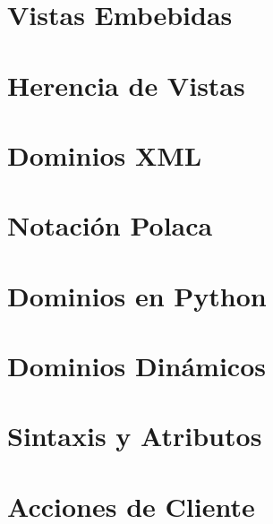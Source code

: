 \documentclass[letterpaper,10pt,spanish]{sphinxmanual}
\begin{document}
\section{Vistas Embebidas}
\label{\detokenize{tecnico/vistas/vistas-embebidas:vistas-embebidas}}\label{\detokenize{tecnico/vistas/vistas-embebidas:id1}}\label{\detokenize{tecnico/vistas/vistas-embebidas::doc}}

\section{Herencia de Vistas}
\label{\detokenize{tecnico/vistas/herencia-de-vistas:herencia-de-vistas}}\label{\detokenize{tecnico/vistas/herencia-de-vistas:id1}}\label{\detokenize{tecnico/vistas/herencia-de-vistas::doc}}


\section{Dominios XML}
\label{\detokenize{tecnico/dominios:dominios-xml}}\label{\detokenize{tecnico/dominios:dominios}}\label{\detokenize{tecnico/dominios::doc}}

\section{Notación Polaca}
\label{\detokenize{tecnico/dominios:notacion-polaca}}

\section{Dominios en Python}
\label{\detokenize{tecnico/dominios:dominios-en-python}}

\section{Dominios Dinámicos}
\label{\detokenize{tecnico/dominios:dominios-dinamicos}}


\section{Sintaxis y Atributos}
\label{\detokenize{tecnico/actions-y-menus:sintaxis-y-atributos}}\label{\detokenize{tecnico/actions-y-menus:actions-y-menus}}\label{\detokenize{tecnico/actions-y-menus::doc}}

\section{Acciones de Cliente}
\label{\detokenize{tecnico/actions-y-menus:acciones-de-cliente}}
\end{document}

